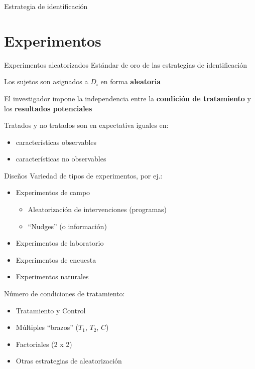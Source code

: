 \documentclass[
  ignorenonframetext,
]{beamer}
\providecommand{\tightlist}{%
  \setlength{\itemsep}{0pt}\setlength{\parskip}{0pt}}
\begin{document}
\begin{frame}{Estrategia de identificación}
\hypertarget{experimentos}{%
\section{Experimentos}\label{experimentos}}

\begin{frame}{Experimentos aleatorizados}
\protect\hypertarget{experimentos-aleatorizados}{}
Estándar de oro de las estrategias de identificación

Los sujetos son asignados a \(D_{i}\) en forma \textbf{aleatoria}

El investigador impone la independencia entre la \textbf{condición de
tratamiento} y los \textbf{resultados potenciales} \pause

Tratados y no tratados son en expectativa iguales en:

\begin{itemize}
\tightlist
\item
  características observables
\item
  características no observables
\end{itemize}
\end{frame}

\begin{frame}{Diseños}
\protect\hypertarget{diseuxf1os}{}
Variedad de tipos de experimentos, por ej.:

\begin{itemize}
\tightlist
\item
  Experimentos de campo

  \begin{itemize}
  \tightlist
  \item
    Aleatorización de intervenciones (programas)
  \item
    ``Nudges'' (o información) \pause
  \end{itemize}
\item
  Experimentos de laboratorio \pause
\item
  Experimentos de encuesta
\item
  Experimentos naturales
\end{itemize}

\pause

Número de condiciones de tratamiento:

\begin{itemize}
\tightlist
\item
  Tratamiento y Control
\item
  Múltiples ``brazos'' (\(T_1\), \(T_2\), \(C\)) \pause
\item
  Factoriales (2 x 2) \pause
\item
  Otras estrategias de aleatorización
\end{itemize}


\end{frame}
\end{frame}
\end{document}
